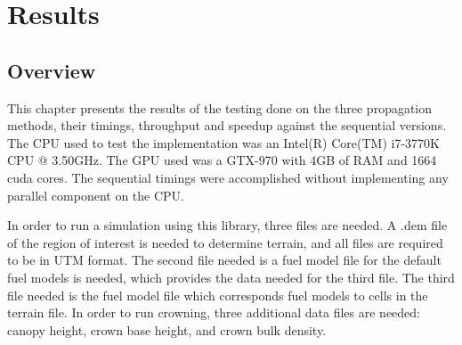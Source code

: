 \chapter{Results}
\label{chapter:results}

\section{Overview}
This chapter presents the results of the testing done on the three propagation methods, their timings, throughput and speedup against the sequential versions. The CPU used to test the implementation was an Intel(R) Core(TM) i7-3770K CPU @ 3.50GHz. The GPU used was a GTX-970 with 4GB of RAM and 1664 cuda cores. The sequential timings were accomplished without implementing any parallel component on the CPU. 

In order to run a simulation using this library, three files are needed. A .dem file of the region of interest is needed to determine terrain, and all files are required to be in UTM format. The second file needed is a fuel model file for the default fuel models is needed, which provides the data needed for the third file. The third file needed is the fuel model file which corresponds fuel models to cells in the terrain file. In order to run crowning, three additional data files are needed: canopy height, crown base height, and crown bulk density. 


